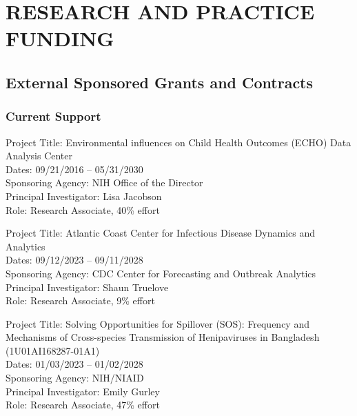 \documentclass{cv}
\begin{document}

\section*{RESEARCH AND PRACTICE FUNDING}

\subsection*{External Sponsored Grants and Contracts}

\subsubsection*{Current Support}

Project Title: Environmental influences on Child Health Outcomes (ECHO) Data Analysis Center \\
Dates: 09/21/2016 -- 05/31/2030 \\
Sponsoring Agency: NIH Office of the Director \\
Principal Investigator: Lisa Jacobson \\
Role: Research Associate, 40\% effort

Project Title: Atlantic Coast Center for Infectious Disease Dynamics and Analytics \\
Dates: 09/12/2023 -- 09/11/2028 \\
Sponsoring Agency: CDC Center for Forecasting and Outbreak Analytics \\
Principal Investigator: Shaun Truelove \\
Role: Research Associate, 9\% effort

Project Title: Solving Opportunities for Spillover (SOS): Frequency and Mechanisms of Cross-species Transmission of Henipaviruses in Bangladesh (1U01AI168287-01A1) \\
Dates: 01/03/2023 -- 01/02/2028 \\
Sponsoring Agency: NIH/NIAID \\
Principal Investigator: Emily Gurley \\
Role: Research Associate, 47\% effort
\end{document}
